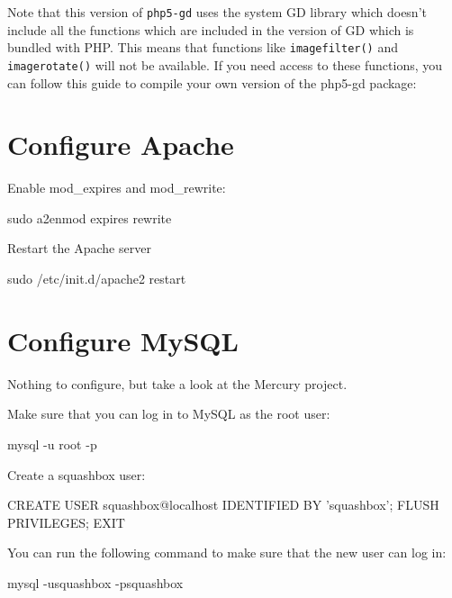 \documentclass[draft,ebook,10pt,twoside,openright]{memoir}
\begin{document}
Note that this version of \verb!php5-gd! uses the system GD library which doesn’t include all the functions which are included in the version of GD which is bundled with PHP. This means that functions like \verb!imagefilter()! and \verb!imagerotate()! will not be available. If you need access to these functions, you can follow this guide to compile your own version of the php5-gd package:


\section{Configure Apache}

Enable mod\_expires and mod\_rewrite:

\begin{squashboxcommand}
sudo a2enmod expires rewrite
\end{squashboxcommand}

Restart the Apache server

\begin{squashboxcommand}
sudo /etc/init.d/apache2 restart
\end{squashboxcommand}

\section{Configure MySQL}

Nothing to configure, but take a look at the Mercury project.

Make sure that you can log in to MySQL as the root user:

\begin{squashboxcommand}
mysql -u root -p
\end{squashboxcommand}

Create a squashbox user:

\begin{squashboxcommand}
CREATE USER squashbox@localhost IDENTIFIED BY 'squashbox';
FLUSH PRIVILEGES;
EXIT
\end{squashboxcommand}

You can run the following command to make sure that the new user can log in:

\begin{squashboxcommand}
mysql -usquashbox -psquashbox
\end{squashboxcommand}
\end{document}
